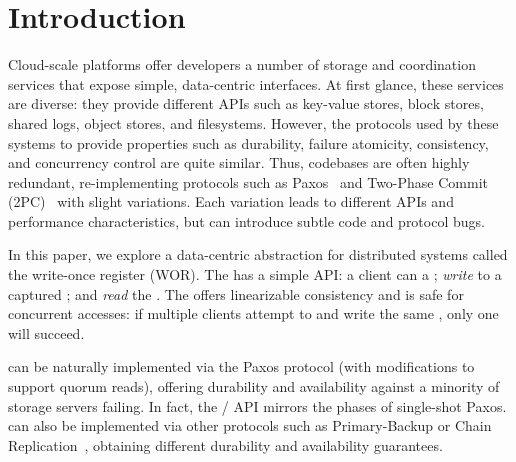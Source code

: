 \section{Introduction}



Cloud-scale platforms offer developers a number of storage and coordination services that expose simple, data-centric interfaces. At first glance, these services are diverse: they provide different APIs such as key-value stores, block stores, shared logs, object stores, and filesystems. However, the protocols used by these systems to provide properties such as durability, failure atomicity, consistency, and concurrency control are quite similar. Thus, codebases are often highly redundant, re-implementing protocols such as Paxos~\cite{paxos} and Two-Phase Commit (2PC)~\cite{2PC} with slight variations. Each variation leads to different APIs and performance characteristics, but can introduce subtle code and protocol bugs.

In this paper, we explore a data-centric abstraction for distributed systems called the write-once register (WOR). The \WOR{} has a simple API: a client can \textit{\prepare{}} a \WOR{}; \textit{write} to a captured \WOR{}; and \textit{read} the \WOR{}. The \WOR{} offers linearizable consistency and is safe for concurrent accesses: if multiple clients attempt to \prepare{} and write the same \WOR{}, only one will succeed.


\WORs{} can be naturally implemented via the Paxos protocol (with modifications to support quorum reads), offering durability and availability against a minority of storage servers failing. In fact, the \WOR{} \api{\prepare{}}/ API mirrors the phases of single-shot Paxos. \WORs{} can also be implemented via other protocols such as Primary-Backup or Chain Replication~\cite{chainreplication}, obtaining different durability and availability guarantees.


